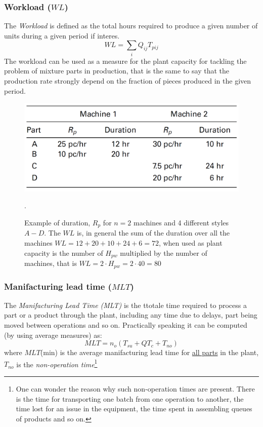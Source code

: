 \subsubsection{Workload ($WL$)}
The \textit{Workload} is defined as the total hours required to produce a given number of units during a given period if interes. 
\begin{equation}
    WL=\sum_{i} Q_{ij} T_{pij}
\end{equation}
The workload can be used as a measure for the plant capacity for tackling the problem of mixture parts in production, that is the same to say that the production rate strongly depend on the fraction of pieces produced in the given period.

\begin{figure}
    \centering
    \includegraphics[scale=0.4]{img/example.png}
    \caption{Example of duration, $R_p$ for $n=2$ machines and 4 different styles $A-D$. The $WL$ is, in general the sum of the duration over all the machines $WL=12+20+10+24+6=72$, when used as plant capacity is the number of $H_{pw}$ multiplied by the number of machines, that is $WL=2\cdot{H_{pw}}=2\cdot{40}=80$}.
\end{figure}

\subsubsection{Manifacturing lead time ($MLT$)}
The \textit{Manifacturing Lead Time (MLT)} is the ttotale time required to process a part or a product through the plant, including any time due to delays, part being moved between operations and so on. Practically speaking it can be computed (by using average measures) as:
\begin{equation}
    MLT=n_o(T_{su}+Q{T_c}+T_{no}) 
\end{equation}
where $MLT$(min) is the average manifacturing lead time for \underline{all parts} in the plant, $T_{no}$ is the \textit{non-operation time}\footnote{
    One can wonder the reason why such non-operation times are present. There is the time for transporting one batch from one operation to another, the time lost for an issue in the equipment, the time spent in assembling queues of products and so on.
} 

